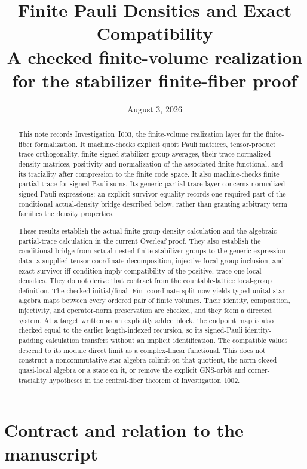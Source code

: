 \documentclass[11pt,reqno]{amsart}
\title[Finite Pauli density realization]{Finite Pauli Densities and Exact Compatibility\\
\large A checked finite-volume realization for the stabilizer finite-fiber proof}
\author{}
\date{August 3, 2026}
\numberwithin{equation}{section}
\theoremstyle{definition}
\theoremstyle{remark}
\begin{document}
\begin{abstract}
This note records Investigation~I003, the finite-volume realization layer for
the finite-fiber formalization.  It machine-checks explicit qubit Pauli
matrices, tensor-product trace orthogonality, finite signed stabilizer group
averages, their trace-normalized density matrices, positivity and normalization
of the associated finite functional, and its traciality after compression to
the finite code space.  It also machine-checks finite partial trace for
signed Pauli sums.  Its generic partial-trace layer concerns normalized signed
Pauli expressions: an explicit survivor equality records one required part of
the conditional actual-density bridge described below, rather than granting
arbitrary term families the density properties.

These results establish the actual finite-group density calculation and the
algebraic partial-trace calculation in the current Overleaf proof.  They also
establish the conditional bridge from actual nested finite stabilizer groups to
the generic expression data: a supplied tensor-coordinate decomposition,
injective local-group inclusion, and exact survivor iff-condition imply
compatibility of the positive, trace-one local densities.  They do not derive
that contract from the countable-lattice local-group definition.  The checked
initial/final $\operatorname{Fin}$ coordinate split now yields typed unital
star-algebra maps between every ordered pair of finite volumes.  Their
identity, composition, injectivity, and operator-norm preservation are
checked, and they form a directed system.  At a target written as an
explicitly added block, the endpoint map is
also checked equal to the earlier length-indexed recursion, so its
signed-Pauli identity-padding calculation transfers without an implicit
identification.  The compatible values descend to its module direct limit as a
complex-linear functional.  This does not construct a noncommutative
star-algebra colimit on that quotient, the norm-closed quasi-local algebra or
a state on it, or remove the explicit GNS-orbit and corner-traciality
hypotheses in the central-fiber theorem of Investigation~I002.
\end{abstract}

\maketitle

\section{Contract and relation to the manuscript}
\label{sec:contract}
\end{document}

